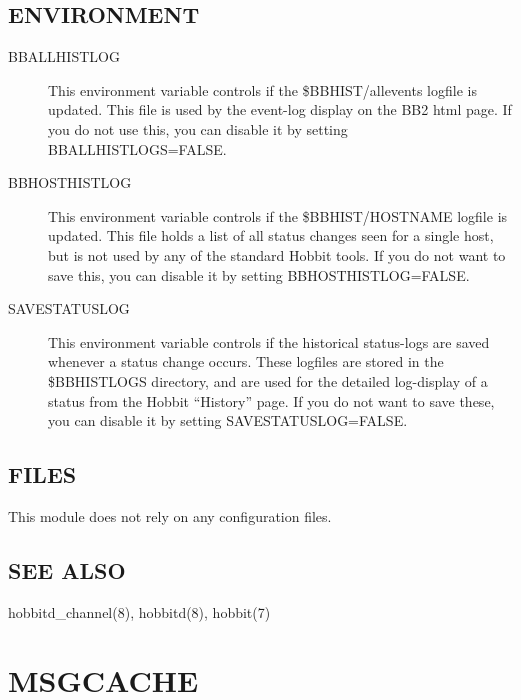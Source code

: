 \subsection{ENVIRONMENT}
\begin{description}
\item[BBALLHISTLOG] This environment variable controls if the
  \$BBHIST/allevents logfile is updated. This file is used by the
  event-log display on the BB2 html page. If you do not use this, you
  can disable it by setting BBALLHISTLOGS=FALSE. 


 

\item[BBHOSTHISTLOG] This environment variable controls if the
  \$BBHIST/HOSTNAME logfile is updated. This file holds a list of all
  status changes seen for a single host, but is not used by any of the
  standard Hobbit tools. If you do not want to save this, you can
  disable it by setting BBHOSTHISTLOG=FALSE. 


 

\item[SAVESTATUSLOG] This environment variable controls if the
  historical status-logs are saved whenever a status change
  occurs. These logfiles are stored in the \$BBHISTLOGS directory, and
  are used for the detailed log-display of a status from the Hobbit
  ``History'' page. If you do not want to save these, you can disable
  it by setting SAVESTATUSLOG=FALSE. 


 


\end{description}
\subsection{FILES}
 This module does not rely on any configuration files. 

 
\subsection{SEE ALSO}
hobbitd\_channel(8), hobbitd(8), hobbit(7) 

  

%

%

\newpage
\section{MSGCACHE}

